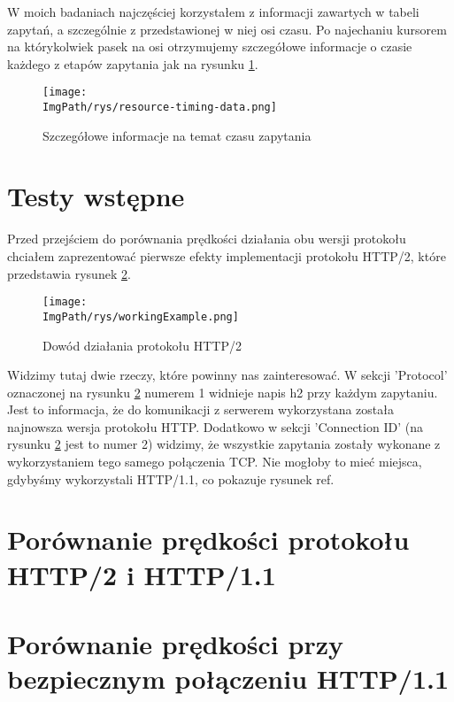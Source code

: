 \documentclass[a4paper,12pt,twoside,openany]{report}
\newcommand{\ImgPath}{.}
\begin{document}
W moich badaniach najczęściej korzystałem z informacji zawartych w tabeli zapytań, a szczególnie z przedstawionej w niej osi czasu.
Po najechaniu kursorem na którykolwiek pasek na osi otrzymujemy szczegółowe informacje o czasie każdego z etapów zapytania jak na rysunku \ref{schematResourceTiming}.

\begin{figure}[!htbp]
	\begin{center}
\centering
\texttt{[image: \\ImgPath/rys/resource-timing-data.png]}
\end{center}
	\caption{Szczegółowe informacje na temat czasu zapytania}
	\label{schematResourceTiming}
\end{figure}

\section{Testy wstępne}

Przed przejściem do porównania prędkości działania obu wersji protokołu chciałem zaprezentować pierwsze efekty implementacji protokołu HTTP/2, które przedstawia rysunek \ref{schematWorkingExample}.

\begin{figure}[!htbp]
	\begin{center}
\centering
\texttt{[image: \\ImgPath/rys/workingExample.png]}
\end{center}
	\caption{Dowód działania protokołu HTTP/2}
	\label{schematWorkingExample}
\end{figure}

Widzimy tutaj dwie rzeczy, które powinny nas zainteresować. W sekcji 'Protocol' oznaczonej na rysunku \ref{schematWorkingExample} numerem 1 widnieje napis h2 przy każdym zapytaniu.
Jest to informacja, że do komunikacji z serwerem wykorzystana została najnowsza wersja protokołu HTTP.
Dodatkowo w sekcji 'Connection ID' (na rysunku \ref{schematWorkingExample} jest to numer 2) widzimy, że wszystkie zapytania zostały wykonane z wykorzystaniem tego samego połączenia TCP.
Nie mogłoby to mieć miejsca, gdybyśmy wykorzystali HTTP/1.1, co pokazuje rysunek ref{}.



\section{Porównanie prędkości protokołu HTTP/2 i HTTP/1.1}

\section{Porównanie prędkości przy bezpiecznym połączeniu HTTP/1.1}
\end{document}
